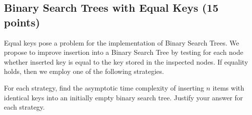 \documentclass{article}
\begin{document}
\begin{enumerate}
\end{enumerate}

\subsection{Binary Search Trees with Equal Keys (15 points)}

Equal keys pose a problem for the implementation of Binary Search Trees. We propose to improve insertion into a Binary Search Tree by testing for each node whether inserted key is equal to the key stored in the inspected nodes. If equality holds, then we employ one of the following strategies.

For each strategy, find the asymptotic time complexity of inserting $n$ items with identical keys into an initially empty binary search tree. Justify your answer for each strategy.
\end{document}
